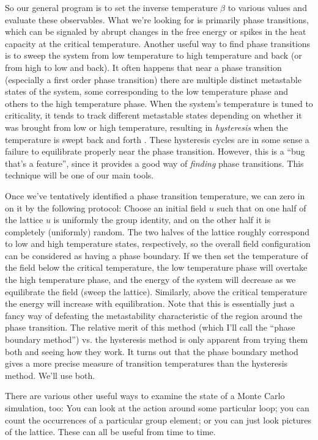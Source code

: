 \documentclass[9pt,twocolumn,twoside]{article}
\begin{document}
So our general program is to set the inverse temperature $\beta$ to various values and evaluate these observables.  What we're looking for is primarily phase transitions, which can be signaled by abrupt changes in the free energy or spikes in the heat capacity at the critical temperature.  Another useful way to find phase transitions is to sweep the system from low temperature to high temperature and back (or from high to low and back).  It often happens that near a phase transition (especially a first order phase transition) there are multiple distinct metastable states of the system, some corresponding to the low temperature phase and others to the high temperature phase.  When the system's temperature is tuned to criticality, it tends to track different metastable states depending on whether it was brought from low or high temperature, resulting in \textit{hysteresis} when the temperature is swept back and forth \cite{Creutz}.  These hysteresis cycles are in some sense a failure to equilibrate properly near the phase transition.  However, this is a ``bug that's a feature'', since it provides a good way of \textit{finding} phase transitions.  This technique will be one of our main tools.  

Once we've tentatively identified a phase transition temperature, we can zero in on it by the following protocol:  Choose an initial field $u$ such that on one half of the lattice $u$ is uniformly the group identity, and on the other half it is completely (uniformly) random.  The two halves of the lattice roughly correspond to low and high temperature states, respectively, so the overall field configuration can be considered as having a phase boundary.  If we then set the temperature of the field below the critical temperature, the low temperature phase will overtake the high temperature phase, and the energy of the system will decrease as we equilibrate the field (sweep the lattice).  Similarly, above the critical temperature the energy will increase with equilibration.  Note that this is essentially just a fancy way of defeating the metastability characteristic of the region around the phase transition.  The relative merit of this method (which I'll call the ``phase boundary method'') vs. the hysteresis method is only apparent from trying them both and seeing how they work.  It turns out that the phase boundary method gives a more precise measure of transition temperatures than the hysteresis method.  We'll use both.  

There are various other useful ways to examine the state of a Monte Carlo simulation, too: You can look at the action around some particular loop; you can count the occurrences of a particular group element; or you can just look pictures of the lattice.  These can all be useful from time to time.  
\end{document}
